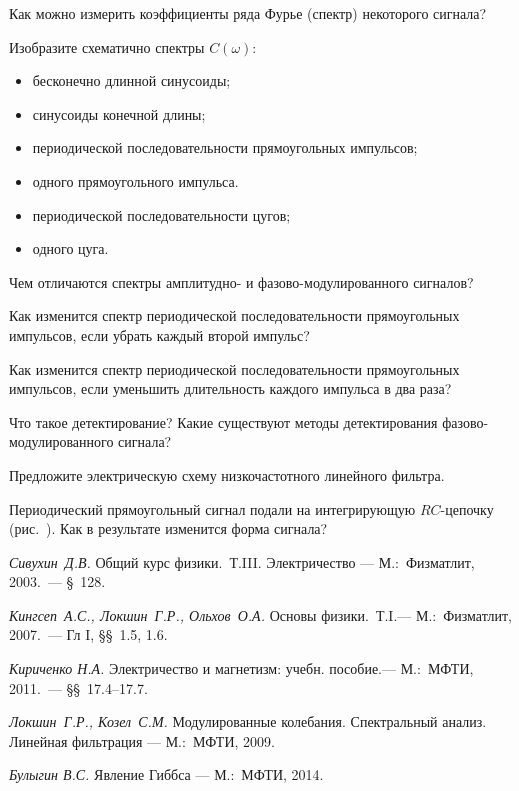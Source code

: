 \begin{lab:questions}
\item Как можно измерить коэффициенты ряда Фурье (спектр) некоторого сигнала?

\item Изобразите схематично спектры $C(\omega)$:
\begin{itemize}
    \item бесконечно длинной синусоиды;
    \item синусоиды конечной длины;
    \item периодической последовательности прямоугольных импульсов;
    \item одного прямоугольного импульса.
    \item периодической последовательности цугов;
    \item одного цуга.
\end{itemize}

\item Чем отличаются спектры амплитудно- и фазово-модулированного сигналов?

\item Как изменится спектр периодической последовательности
прямоугольных импульсов, если убрать каждый второй импульс?

\item Как изменится спектр периодической последовательности прямоугольных
импульсов, если уменьшить длительность каждого импульса в два раза?

\item Что такое детектирование? Какие существуют методы детектирования
фазово-модулированного сигнала?

\item Предложите электрическую схему низкочастотного линейного фильтра.

\item Периодический прямоугольный сигнал подали на интегрирующую $RC$-цепочку
(рис.~). Как в результате изменится форма сигнала?

\end{lab:questions}

\begin{lab:literature}
    \item \textit{Сивухин~Д.В.} Общий курс физики.~Т.III. Электричество ---
М.:~Физматлит, 2003.~--- \S~128.
    \item \textit{Кингсеп~А.С., Локшин~Г.Р., Ольхов~О.А.} Основы физики.~Т.I.---
М.:~Физматлит, 2007.~--- Гл I, \S\S~1.5, 1.6.
    \item \textit{Кириченко Н.А.} Электричество и магнетизм: учебн. пособие.---
    М.:~МФТИ, 2011.~--- \S\S~17.4--17.7.
    \item \textit{Локшин~Г.Р., Козел~С.М.} Модулированные колебания. Спектральный
анализ. Линейная фильтрация --- М.:~МФТИ, 2009.
\item *\textit{Булыгин В.С.} Явление Гиббса --- М.:~МФТИ, 2014.
\end{lab:literature}




